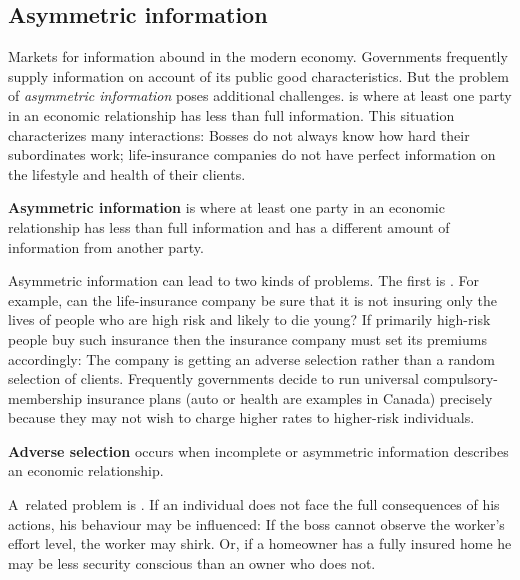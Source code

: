 \newhtmlpage

\subsection*{Asymmetric information}

Markets for information abound in the modern economy. Governments frequently
supply information on account of its public good characteristics. But the
problem of \textit{asymmetric information} poses additional challenges. %
 is where at least one party in an
economic relationship has less than full information. This situation
characterizes many interactions: Bosses do not always know how hard their
subordinates work; life-insurance companies do not have perfect information
on the lifestyle and health of their clients.

\begin{DefBox}
	\textbf{Asymmetric information} is where at least one party in an economic relationship has less than full information and has a different amount of information from another party.
\end{DefBox}

Asymmetric information can lead to two kinds of problems. The first is %
. For example, can the life-insurance company
be sure that it is not insuring only the lives of people who are high risk
and likely to die young? If primarily high-risk people buy such insurance
then the insurance company must set its premiums accordingly: The company is
getting an adverse selection rather than a random selection of clients.
Frequently governments decide to run universal compulsory-membership insurance plans
(auto or health are examples in Canada) precisely because they may not wish
to charge higher rates to higher-risk individuals.

\begin{DefBox}
	\textbf{Adverse selection} occurs when incomplete or asymmetric information describes an economic relationship.
\end{DefBox}

\newhtmlpage

A\ related problem is . If an individual does not
face the full consequences of his actions, his behaviour may be influenced:
If the boss cannot observe the worker's effort level, the worker may shirk.
Or, if a homeowner has a fully insured home he may be less security
conscious than an owner who does not.


